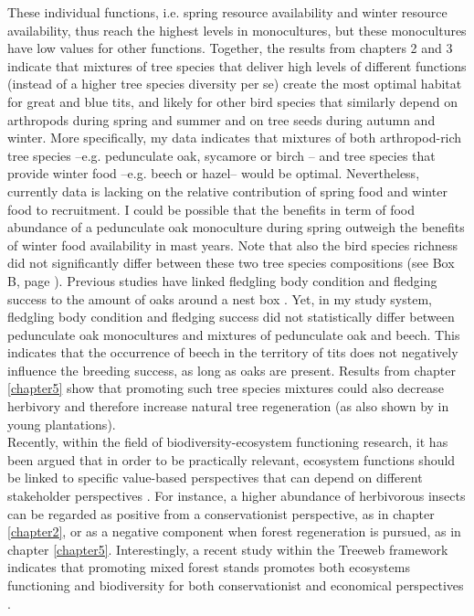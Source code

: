 \documentclass[10pt, twoside]{book} %
\begin{document}
	These individual functions, i.e. spring resource availability and winter resource availability, thus reach the highest levels in monocultures, but these monocultures have low values for other functions. Together, the results from chapters 2 and 3 indicate that mixtures of tree species that deliver high levels of different functions (instead of a higher tree species diversity per se) create the most optimal habitat for great and blue tits, and likely for other bird species that similarly depend on arthropods during spring and summer and on tree seeds during autumn and winter. More specifically, my data indicates that mixtures of both arthropod-rich tree species --e.g. pedunculate oak, sycamore or birch \citep{Shutt2018}-- and tree species that provide winter food --e.g. beech or hazel-- would be optimal. Nevertheless,  currently data is lacking on the relative contribution of spring food and winter food to recruitment. I could be possible that the benefits in term of food abundance of a pedunculate oak monoculture during spring outweigh the benefits of winter food availability in mast years. Note that also the bird species richness did not significantly differ between these two tree species compositions (see Box B, page \pageref{boxb}). Previous studies have linked fledgling body condition and fledging success to the amount of oaks around a nest box \citep{Wilkin2007a, Shutt2018}. Yet, in my study system, fledgling  body condition and fledging success did not statistically differ between pedunculate oak monocultures and mixtures of pedunculate oak and beech. This indicates that the occurrence of beech in the territory of tits does not negatively influence the breeding success, as long as oaks are present. Results from chapter \ref{chapter5} show that promoting such tree species mixtures could also decrease herbivory and therefore increase natural tree regeneration (as also shown by \citealt{Alalouni2014, Setiawan2014} in young plantations). \\
	
	Recently, within the field of biodiversity-ecosystem functioning research, it has been argued that in order to be practically relevant, ecosystem functions should be linked to specific value-based perspectives that can depend on different stakeholder perspectives \citep{Slade2017, Manning2018, Hertzog2019}. For instance, a higher abundance of herbivorous insects can be regarded as positive from a conservationist perspective, as in chapter \ref{chapter2}, or as a negative component when forest regeneration is pursued, as in chapter \ref{chapter5}. Interestingly, a recent study within the Treeweb framework indicates that promoting mixed forest stands promotes both ecosystems functioning and biodiversity for both conservationist and economical perspectives \citep{Hertzog2020}.\\
	
\end{document}
